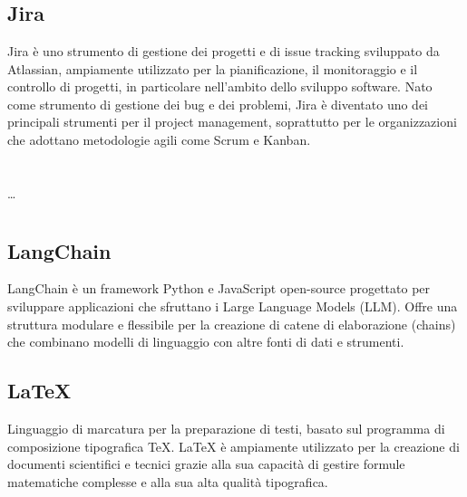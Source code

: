 
\section{}

\subsection*{Jira}
Jira è uno strumento di gestione dei progetti e di issue tracking sviluppato da Atlassian, ampiamente utilizzato per la pianificazione, il monitoraggio e 
il controllo di progetti, in particolare nell'ambito dello sviluppo software. Nato come strumento di gestione dei bug e dei problemi, Jira è diventato uno 
dei principali strumenti per il project management, soprattutto per le organizzazioni che adottano metodologie agili come Scrum e Kanban.

\newpage



\section{}

\dots

\newpage



\section{}

\hypertarget{sec:langchain}{}
\subsection*{LangChain}
LangChain è un framework Python e JavaScript open-source progettato per sviluppare applicazioni che sfruttano i Large Language Models 
(LLM). Offre una struttura modulare e flessibile per la creazione di catene di elaborazione (chains) che combinano modelli di 
linguaggio con altre fonti di dati e strumenti.

\subsection*{\LaTeX}
Linguaggio di marcatura per la preparazione di testi, basato sul programma di composizione tipografica TeX. LaTeX è ampiamente utilizzato per la creazione 
di documenti scientifici e tecnici grazie alla sua capacità di gestire formule matematiche complesse e alla sua alta qualità tipografica.

